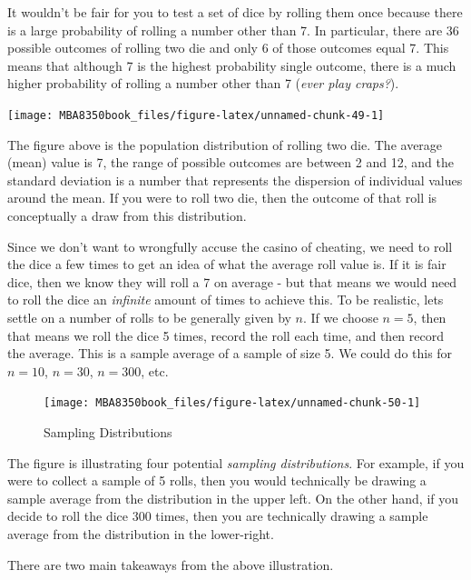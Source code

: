 \documentclass[
]{book}
\begin{document}
It wouldn't be fair for you to test a set of dice by rolling them once because there is a large probability of rolling a number other than 7. In particular, there are 36 possible outcomes of rolling two die and only 6 of those outcomes equal 7. This means that although 7 is the highest probability single outcome, there is a much higher probability of rolling a number other than 7 (\emph{ever play craps?}).

\begin{center}\texttt{[image: MBA8350book\_files/figure-latex/unnamed-chunk-49-1]} \end{center}

The figure above is the population distribution of rolling two die. The average (mean) value is 7, the range of possible outcomes are between 2 and 12, and the standard deviation is a number that represents the dispersion of individual values around the mean. If you were to roll two die, then the outcome of that roll is conceptually a draw from this distribution.

Since we don't want to wrongfully accuse the casino of cheating, we need to roll the dice a few times to get an idea of what the average roll value is. If it is fair dice, then we know they will roll a 7 on average - but that means we would need to roll the dice an \emph{infinite} amount of times to achieve this. To be realistic, lets settle on a number of rolls to be generally given by \(n\). If we choose \(n=5\), then that means we roll the dice 5 times, record the roll each time, and then record the average. This is a sample average of a sample of size 5. We could do this for \(n=10\), \(n=30\), \(n=300\), etc.

\begin{figure}

{\centering \texttt{[image: MBA8350book\_files/figure-latex/unnamed-chunk-50-1]} 

}

\caption{Sampling Distributions}\label{fig:unnamed-chunk-50}
\end{figure}

The figure is illustrating four potential \emph{sampling distributions}. For example, if you were to collect a sample of 5 rolls, then you would technically be drawing a sample average from the distribution in the upper left. On the other hand, if you decide to roll the dice 300 times, then you are technically drawing a sample average from the distribution in the lower-right.

There are two main takeaways from the above illustration.
\end{document}
